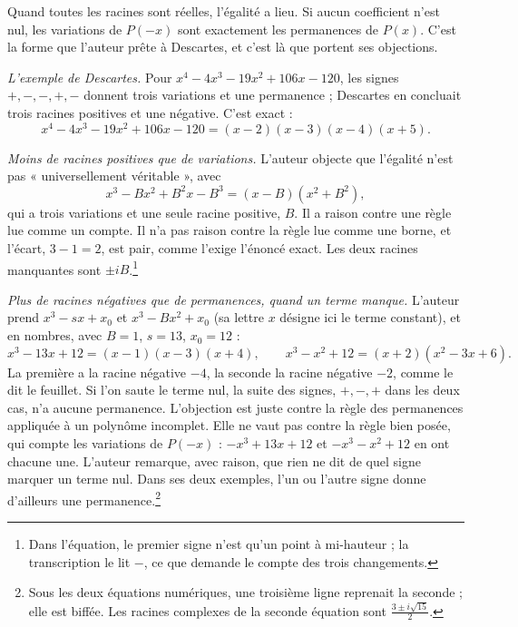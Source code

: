 \documentclass[11pt,a4paper]{article}
\begin{document}
Quand toutes les racines sont réelles, l'égalité a lieu. Si aucun coefficient
n'est nul, les variations de \(P(-x)\) sont exactement les permanences de
\(P(x)\). C'est la forme que l'auteur prête à Descartes, et c'est là que
portent ses objections.

\emph{L'exemple de Descartes.} Pour \(x^4-4x^3-19x^2+106x-120\), les signes
\(+,-,-,+,-\) donnent trois variations et une permanence ; Descartes en
concluait trois racines positives et une négative. C'est exact :
\[
x^4-4x^3-19x^2+106x-120=(x-2)(x-3)(x-4)(x+5).
\]

\emph{Moins de racines positives que de variations.} L'auteur objecte que
l'égalité n'est pas « universellement véritable », avec
\[
x^3-Bx^2+B^2x-B^3=(x-B)(x^2+B^2),
\]
qui a trois variations et une seule racine positive, \(B\). Il a raison
contre une règle lue comme un compte. Il n'a pas raison contre la règle lue
comme une borne, et l'écart, \(3-1=2\), est pair, comme l'exige l'énoncé exact.
Les deux racines manquantes sont \(\pm iB\).\footnote{Dans l'équation, le
premier signe n'est qu'un point à mi-hauteur ; la transcription le lit \(-\),
ce que demande le compte des trois changements.}

\emph{Plus de racines négatives que de permanences, quand un terme manque.}
L'auteur prend \(x^3-sx+x_0\) et \(x^3-Bx^2+x_0\) (sa lettre \(x\) désigne ici
le terme constant), et en nombres, avec \(B=1\), \(s=13\), \(x_0=12\) :
\[
x^3-13x+12=(x-1)(x-3)(x+4),\qquad x^3-x^2+12=(x+2)(x^2-3x+6).
\]
La première a la racine négative \(-4\), la seconde la racine négative
\(-2\), comme le dit le feuillet. Si l'on saute le terme nul, la suite des
signes, \(+,-,+\) dans les deux cas, n'a aucune permanence. L'objection est
juste contre la règle des permanences appliquée à un polynôme incomplet. Elle
ne vaut pas contre la règle bien posée, qui compte les variations de
\(P(-x)\) : \(-x^3+13x+12\) et \(-x^3-x^2+12\) en ont chacune une. L'auteur
remarque, avec raison, que rien ne dit de quel signe marquer un terme nul.
Dans ses deux exemples, l'un ou l'autre signe donne d'ailleurs une
permanence.\footnote{Sous les deux équations numériques, une troisième ligne
reprenait la seconde ; elle est biffée. Les racines complexes de la seconde
équation sont \(\tfrac{3\pm i\sqrt{15}}{2}\).}
\end{document}
